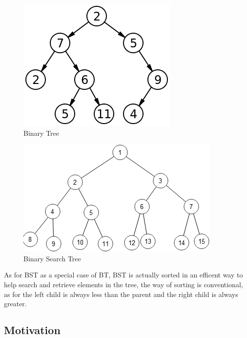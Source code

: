 \documentclass[10pt,a4paper]{article}
\begin{document}
\begin{figure}[htbp]
\centering
\includegraphics[width=\textwidth]{images/sample_image.png}
\caption{Binary Tree}
\end{figure}

\begin{figure}[htbp]
\centering
\includegraphics[width=\textwidth]{images/HUufp.png}
\caption{Binary Search Tree}
\end{figure}


As for BST as a special case of BT, BST is actually sorted in an efficent way to help search and retrieve elements in the tree, the way of sorting is conventional, as for the left child is always less than the parent and the right child is always greater.

\subsection{Motivation}
\end{document}
